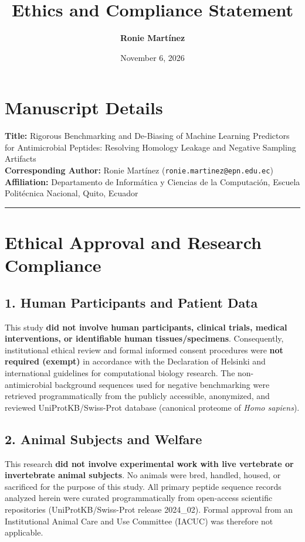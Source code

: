 \documentclass[11pt,a4paper]{article}
\title{\textbf{Ethics and Compliance Statement}}
\author{\textbf{Ronie Martínez}}
\date{November 6, 2026}
\begin{document}
\maketitle

\section*{Manuscript Details}
\textbf{Title:} Rigorous Benchmarking and De-Biasing of Machine Learning Predictors for Antimicrobial Peptides: Resolving Homology Leakage and Negative Sampling Artifacts\\
\textbf{Corresponding Author:} Ronie Martínez (\texttt{ronie.martinez@epn.edu.ec})\\
\textbf{Affiliation:} Departamento de Informática y Ciencias de la Computación, Escuela Politécnica Nacional, Quito, Ecuador

\vspace{0.5cm}
\hrule
\vspace{0.5cm}

\section*{Ethical Approval and Research Compliance}

\subsection*{1. Human Participants and Patient Data}
This study \textbf{did not involve human participants, clinical trials, medical interventions, or identifiable human tissues/specimens}. Consequently, institutional ethical review and formal informed consent procedures were \textbf{not required (exempt)} in accordance with the Declaration of Helsinki and international guidelines for computational biology research. The non-antimicrobial background sequences used for negative benchmarking were retrieved programmatically from the publicly accessible, anonymized, and reviewed UniProtKB/Swiss-Prot database (canonical proteome of \textit{Homo sapiens}).

\subsection*{2. Animal Subjects and Welfare}
This research \textbf{did not involve experimental work with live vertebrate or invertebrate animal subjects}. No animals were bred, handled, housed, or sacrificed for the purpose of this study. All primary peptide sequence records analyzed herein were curated programmatically from open-access scientific repositories (UniProtKB/Swiss-Prot release 2024\_02). Formal approval from an Institutional Animal Care and Use Committee (IACUC) was therefore not applicable.
\end{document}
